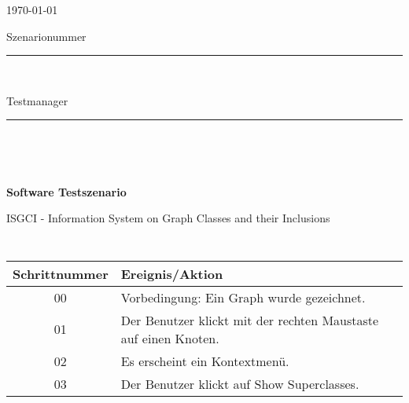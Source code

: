 


\thispagestyle{empty} %


\begin{minipage}[l]{0.6\textwidth}
{\large \today}\\

{\large Szenarionummer \rule{1cm}{0.4pt}}\\

{\large Testmanager \rule{4cm}{0.4pt}}\\

\end{minipage}
\begin{minipage}{0.4\textwidth}
\end{minipage}\\


\vspace*{1cm} 
\begin{center}
\textbf{{\LARGE Software Testszenario}}\\
\end{center}

\begin{center}
{\large ISGCI - Information System on Graph Classes and their Inclusions}\\
\end{center}


$ $\\


	$ $\\

\begin{tabular}{|c|l|}
\hline
\rule{0.00\textwidth}{0.5cm} \textbf{Schrittnummer} & \textbf{Ereignis/Aktion} \hspace{0.55\textwidth} \\[0.25cm]
\hline 
\rule{0.00\textwidth}{0.5cm} 00 & Vorbedingung: Ein Graph wurde gezeichnet. \\[0.25cm]
\hline
 \rule{0.00\textwidth}{0.5cm} 01 & Der Benutzer klickt mit der rechten Maustaste auf einen Knoten. \\[0.25cm]
\hline 
 \rule{0.00\textwidth}{0.5cm} 02 & Es erscheint ein Kontextmenü. \\[0.25cm]
\hline 
 \rule{0.00\textwidth}{0.5cm} 03 & Der Benutzer klickt auf Show Superclasses. \\[0.25cm]
\hline
\end{tabular} \ \\

